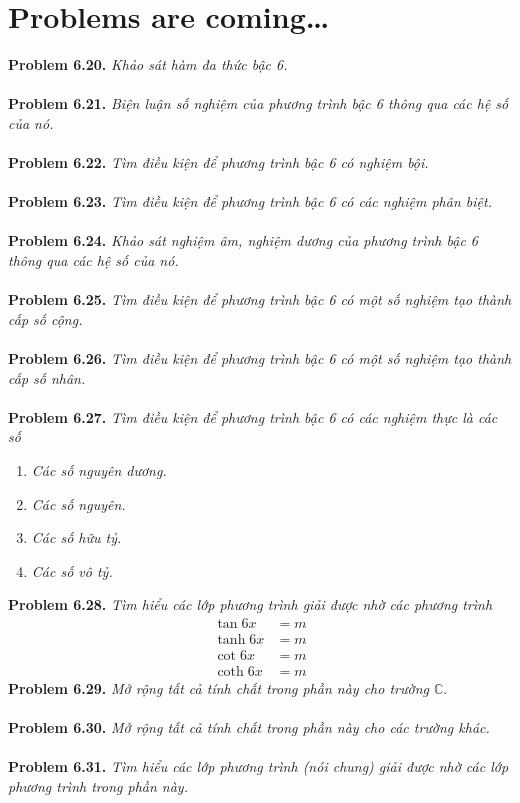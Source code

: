 \documentclass[a4paper,oneside]{book}
\numberwithin{equation}{chapter}
\begin{document}
\section{Problems are coming\ldots}
\textbf{Problem 6.20.} \textit{Khảo sát hàm đa thức bậc 6.}\\
\\
\textbf{Problem 6.21.} \textit{Biện luận số nghiệm của phương trình bậc 6 thông qua các hệ số của nó.}\\
\\
\textbf{Problem 6.22.} \textit{Tìm điều kiện để phương trình bậc 6 có nghiệm bội.}\\
\\
\textbf{Problem 6.23.} \textit{Tìm điều kiện để phương trình bậc 6 có các nghiệm phân biệt.}\\
\\
\textbf{Problem 6.24.} \textit{Khảo sát nghiệm âm, nghiệm dương của phương trình bậc 6 thông qua các hệ số của nó.}\\
\\
\textbf{Problem 6.25.} \textit{Tìm điều kiện để phương trình bậc 6 có một số nghiệm tạo thành cấp số cộng.}\\
\\
\textbf{Problem 6.26.} \textit{Tìm điều kiện để phương trình bậc 6 có một số nghiệm tạo thành cấp số nhân.}\\
\\
\textbf{Problem 6.27.} \textit{Tìm điều kiện để phương trình bậc 6 có các nghiệm thực là các số}
\begin{enumerate}
\item \textit{Các số nguyên dương.}
\item \textit{Các số nguyên.}
\item \textit{Các số hữu tỷ.}
\item \textit{Các số vô tỷ.}
\end{enumerate}
\textbf{Problem 6.28.} \textit{Tìm hiểu các lớp phương trình giải được nhờ các phương trình}
\begin{align}
\tan 6x &= m\\
\tanh 6x &= m\\
\cot 6x &= m\\
\coth 6x &= m
\end{align}
\textbf{Problem 6.29.} \textit{Mở rộng tất cả tính chất trong phần này cho trường $\mathbb{C}$}.\\
\\
\textbf{Problem 6.30.} \textit{Mở rộng tất cả tính chất trong phần này cho các trường khác.}\\
\\
\textbf{Problem 6.31.} \textit{Tìm hiểu các lớp phương trình (nói chung) giải được nhờ các lớp phương trình trong phần này.}
\end{document}
